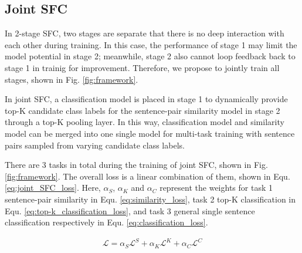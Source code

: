 \subsection{Joint SFC}
In 2-stage SFC, two stages are separate that there is no deep interaction with each other during training. 
In this case, the performance of stage 1 may limit the model potential in stage 2; 
meanwhile, stage 2 also cannot loop feedback back to stage 1 in trainig for improvement. 
Therefore, we propose to jointly train all stages, shown in Fig. \ref{fig:framework}.

In joint SFC, a classification model is placed in stage 1 to dynamically provide top-K candidate class labels for the sentence-pair similarity model in stage 2 through a top-K pooling layer.
In this way, classification model and similarity model can be merged into one single model for multi-task training with sentence pairs sampled from varying candidate class labels.

There are 3 tasks in total during the training of joint SFC, shown in Fig. \ref{fig:framework}. 
The overall loss is a linear combination of them, shown in Equ. \ref{eq:joint_SFC_loss}. 
Here, $\alpha_S$, $\alpha_K$ and $\alpha_C$ represent the weights for task 1 sentence-pair similarity in Equ. \ref{eq:similarity_loss}, task 2 top-K classification in Equ. \ref{eq:top-k_classification_loss}, and task 3 general single sentence classification respectively in Equ.  \ref{eq:classification_loss}.

\vspace{-1.5em}
\begin{align}
  \mathcal{L} = \alpha_S \mathcal{L}^S + \alpha_K \mathcal{L}^K + \alpha_C \mathcal{L}^C
  \label{eq:joint_SFC_loss}
\end{align}
\vspace{-1.5em}
